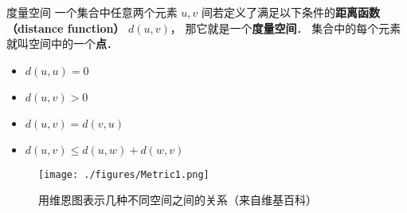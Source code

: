 
\begin{definition}{度量空间}
一个集合中任意两个元素 $u, v$ 间若定义了满足以下条件的\textbf{距离函数（distance function）} $d(u, v)$， 那它就是一个\textbf{度量空间}． 集合中的每个元素就叫空间中的一个\textbf{点}．
\begin{itemize}
\item $d(u, u) = 0$
\item $d(u, v) > 0$
\item $d(u, v) = d(v, u)$
\item $d(u, v) \leqslant d(u, w) + d(w, v)$
\end{itemize}

\end{definition}

\begin{figure}[ht]
\centering
\texttt{[image: ./figures/Metric1.png]}
\caption{用维恩图表示几种不同空间之间的关系（来自维基百科）} \label{Metric_fig1}
\end{figure}
